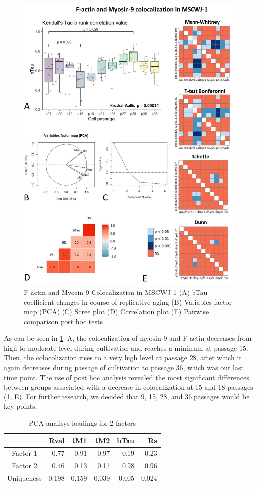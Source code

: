 \documentclass[english,authoryear]{elsarticle}
\begin{document}
\begin{figure}[hbt!]
\centering
\includegraphics[width=0.9\linewidth]{fig_m9-actin-col.jpg}
\caption{F-actin and Myosin-9 Colocalization in MSCWJ-1 (A) bTau coefficient changes in course of replicative aging (B) Variables factor map (PCA) (C) Scree plot (D) Correlation plot (E) Pairwise comparison post hoc tests}
\label{m9-actin-col}
\end{figure}


As can be seen in \ref{m9-actin-col}, A, the colocalization of myosin-9 and F-actin decreases from high to moderate level during cultivation and reaches a minimum at passage 15.
Then, the colocolization rises to a very high level at passage 28, after which it again decreases during passage of cultivation to passage 36, which was our last time point.
The use of post hoc analysis revealed the most significant differences between groups associated with a decrease in colocalization at 15 and 18 passages (\ref{m9-actin-col}, E).
For further research, we decided that 9, 15, 28, and 36 passages would be key points.

\begin{table}[ht]
  \label{tab:pca-M9}
  \caption{PCA analisys loadings for 2 factors}
\centering
\begin{tabular}{c|rrrrr}
  \hline
  & Rval & tM1 & tM2 & bTau & Rs \\
  \hline
Factor 1 & 0.77 & 0.91 & 0.97 & 0.19 & 0.23 \\
  Factor 2 & 0.46 & 0.13 & 0.17 & 0.98 & 0.96 \\
Uniqueness &  0.198 & 0.159 & 0.039 & 0.005 & 0.024 \\
   \hline
\end{tabular}
\end{table}
\end{document}
